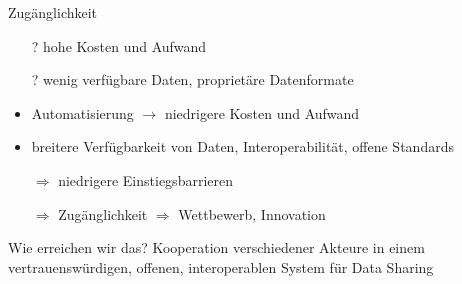 \begin{frame}{Zugänglichkeit}
    \begin{itemize}
        \item[?] hohe Kosten und Aufwand
        \item[?] wenig verfügbare Daten, proprietäre Datenformate
    \end{itemize}

    \pause
    \begin{itemize}
        \item Automatisierung $\to$ niedrigere Kosten und Aufwand
        \item breitere Verfügbarkeit von Daten, Interoperabilität, offene Standards

        \pause
        \item[$\Rightarrow$] niedrigere Einstiegsbarrieren
        \item[$\Rightarrow$] Zugänglichkeit $\Rightarrow$ Wettbewerb, Innovation
    \end{itemize}
\end{frame}


\begin{frame}{Wie erreichen wir das?}
    \Large Kooperation verschiedener Akteure in einem vertrauenswürdigen,
           offenen, interoperablen System für Data Sharing

\end{frame}
